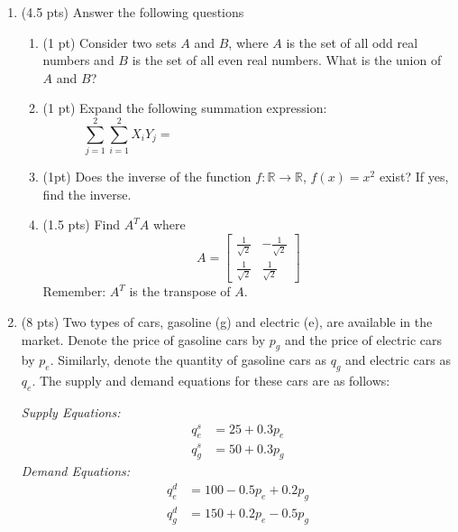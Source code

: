 \documentclass{./../../latex/tests}
\begin{document}
\thispagestyle{plain}
\vspace{0.5em}

\begin{enumerate}	

\item (4.5 pts) Answer the following questions
\begin{enumerate}
\item (1 pt) Consider two sets $A$ and $B$, where $A$ is the set of all odd real numbers and $B$ is the set of all even real numbers. What is the union of $A$ and $B$? 
\vspace{3cm}
\item (1 pt) Expand the following summation expression: \[\sum_{j=1}^2  \sum_{i=1}^2 X_i Y_j = \hspace{8cm}\]
 \vspace{1cm}
\item (1pt) Does the inverse of the function $f: \mathbb{R} \rightarrow \mathbb{R}$, $f(x)=x^2$ exist? If yes, find the inverse.
\vspace{3cm}
\newpage
\item (1.5 pts) Find $A^T A$ where \[ A=\begin{bmatrix}
	\frac{1}{\sqrt{2}} & -\frac{1}{\sqrt{2}} \\ \frac{1}{\sqrt{2}} & \frac{1}{\sqrt{2}}
\end{bmatrix} \]
Remember: $A^T$ is the transpose of $A$.
\vspace{6cm}

\end{enumerate}

\newpage
\item (8 pts) Two types of cars, gasoline (g) and electric (e), are available in the market. Denote the price of gasoline cars by \(p_g\) and the price of electric cars by \(p_e\). Similarly, denote the quantity of gasoline cars as \(q_g\) and electric cars as \(q_e\). The supply and demand equations for these cars are as follows:

\textit{Supply Equations:}
\begin{align*}
q^s_e &= 25 + 0.3p_e \\
q^s_g &= 50 + 0.3p_g
\end{align*}
\textit{Demand Equations:}
\begin{align*}
q^d_e &= 100 - 0.5p_e + 0.2p_g \\
q^d_g &= 150 + 0.2p_e - 0.5p_g
\end{align*}


\end{enumerate}
\end{document}
